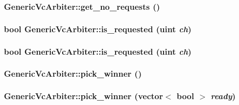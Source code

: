 \hypertarget{classGenericVcArbiter_0648f3756140fa6acc1e9345015b3461}{
\subsubsection[{get\_\-no\_\-requests}]{ GenericVcArbiter::get\_\-no\_\-requests ()}}
\label{classGenericVcArbiter_0648f3756140fa6acc1e9345015b3461}


\hypertarget{classGenericVcArbiter_bea0f63a51a1bfbfe7bd3a3ee0b95b48}{
\subsubsection[{is\_\-requested}]{\setlength{\rightskip}{0pt plus 5cm}bool GenericVcArbiter::is\_\-requested ({\bf uint} {\em ch})}}
\label{classGenericVcArbiter_bea0f63a51a1bfbfe7bd3a3ee0b95b48}


\hypertarget{classGenericVcArbiter_bea0f63a51a1bfbfe7bd3a3ee0b95b48}{
\subsubsection[{is\_\-requested}]{\setlength{\rightskip}{0pt plus 5cm}bool GenericVcArbiter::is\_\-requested ({\bf uint} {\em ch})}}
\label{classGenericVcArbiter_bea0f63a51a1bfbfe7bd3a3ee0b95b48}


\hypertarget{classGenericVcArbiter_55ce40bdf8fa7c2ea448ee5aa5c50921}{
\subsubsection[{pick\_\-winner}]{ GenericVcArbiter::pick\_\-winner ()}}
\label{classGenericVcArbiter_55ce40bdf8fa7c2ea448ee5aa5c50921}


\hypertarget{classGenericVcArbiter_d5d1e1d3532c52f4e3cdb92ab2a235ec}{
\subsubsection[{pick\_\-winner}]{ GenericVcArbiter::pick\_\-winner (vector$<$ bool $>$ {\em ready})}}
\label{classGenericVcArbiter_d5d1e1d3532c52f4e3cdb92ab2a235ec}


